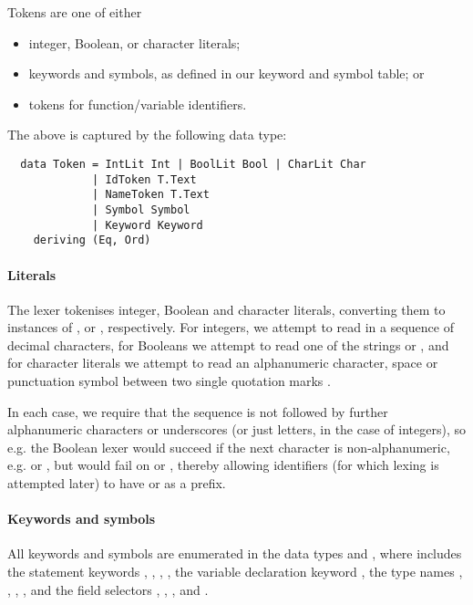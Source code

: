 Tokens are one of either \vspace{-1mm}
\begin{itemize}[itemsep=0mm]
  \item integer, Boolean, or character literals;
  \item keywords and symbols, as defined in our keyword and symbol table; or
  \item tokens for function/variable identifiers.
\end{itemize}
%
The above is captured by the following data type:
\begin{verbatim}
  data Token = IntLit Int | BoolLit Bool | CharLit Char
             | IdToken T.Text
             | NameToken T.Text
             | Symbol Symbol
             | Keyword Keyword
    deriving (Eq, Ord)
\end{verbatim}


\paragraph{Literals}
The lexer tokenises integer, Boolean and character literals, converting them to
instances of ,  or ,
respectively.
For integers, we attempt to read in a sequence of decimal characters,
for Booleans we attempt to read one of the strings  or
, and for character literals we attempt to read an alphanumeric
character, space or punctuation symbol between two single quotation marks
.

In each case, we require that the sequence is not followed by further
alphanumeric characters or underscores (or just letters, in the case of
integers), so e.g. the Boolean lexer would succeed if the next character is
non-alphanumeric, e.g.  or , but would fail on 
or , thereby allowing identifiers (for which lexing is attempted
later) to have  or  as a prefix.


\paragraph{Keywords and symbols}
All keywords and symbols are enumerated in the data types  and
, where  includes the statement keywords
, , , , the variable declaration
keyword , the type names , , , ,
and the field selectors , , , and .

